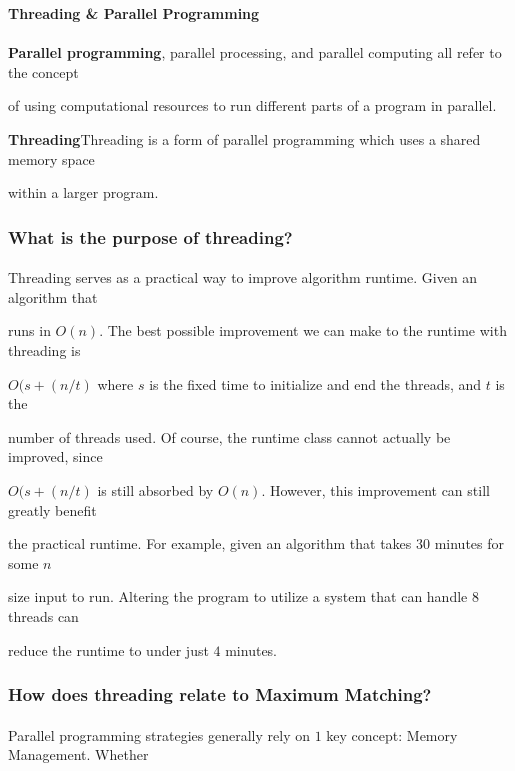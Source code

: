 
\textbf{Threading \& Parallel Programming}

\paragraph{}
\textbf{Parallel programming}, parallel processing, and parallel computing all refer to the concept 

of using computational resources to run different parts of a program in parallel. 

\textbf{Threading}Threading is a form of parallel programming which uses a shared memory space 

within a larger program. 


\subsubsection*{What is the purpose of threading?}


\paragraph{}
Threading serves as a practical way to improve algorithm runtime. Given an algorithm that 

runs in $O(n)$. The best possible improvement we can make to the runtime with threading is 

$O(s+(n/t)$ where $s$ is the fixed time to initialize and end the threads, and $t$ is the 

number of threads used. Of course, the runtime class cannot actually be improved, since 

$O(s+(n/t)$ is still absorbed by $O(n)$. However, this improvement can still greatly benefit 

the practical runtime. For example, given an algorithm that takes $30$ minutes for some $n$ 

size input to run. Altering the program to utilize a system that can handle 8 threads can 

reduce the runtime to under just $4$ minutes. 


\subsubsection*{How does threading relate to Maximum Matching?}


\paragraph{}
Parallel programming strategies generally rely on $1$ key concept: Memory Management. Whether 

